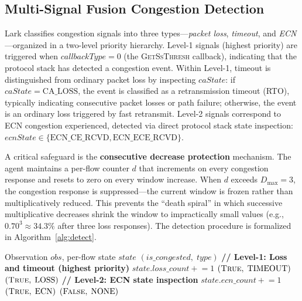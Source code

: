 \documentclass[10pt,twocolumn]{article}
\begin{document}
\subsection{Multi-Signal Fusion Congestion Detection}

Lark classifies congestion signals into three types---\textit{packet loss}, \textit{timeout}, and \textit{ECN}---organized in a two-level priority hierarchy. Level-1 signals (highest priority) are triggered when $callbackType = 0$ (the \textsc{GetSsThresh} callback), indicating that the protocol stack has detected a congestion event. Within Level-1, timeout is distinguished from ordinary packet loss by inspecting $caState$: if $caState = \text{CA\_LOSS}$, the event is classified as a retransmission timeout (RTO), typically indicating consecutive packet losses or path failure; otherwise, the event is an ordinary loss triggered by fast retransmit. Level-2 signals correspond to ECN congestion experienced, detected via direct protocol stack state inspection: $ecnState \in \{\text{ECN\_CE\_RCVD}, \text{ECN\_ECE\_RCVD}\}$.

A critical safeguard is the \textbf{consecutive decrease protection} mechanism. The agent maintains a per-flow counter $d$ that increments on every congestion response and resets to zero on every window increase. When $d$ exceeds $D_{\max} = 3$, the congestion response is suppressed---the current window is frozen rather than multiplicatively reduced. This prevents the ``death spiral'' in which successive multiplicative decreases shrink the window to impractically small values (e.g., $0.70^3 \approx 34.3\%$ after three loss responses). The detection procedure is formalized in Algorithm~\ref{alg:detect}.

\begin{algorithm}[htbp]
\caption{Multi-Signal Fusion Congestion Detection}
\label{alg:detect}
\small
\begin{algorithmic}[1]
\REQUIRE Observation $obs$, per-flow state $state$
\ENSURE $(is\_congested, \; type)$
\STATE \textbf{// Level-1: Loss and timeout (highest priority)}
    \STATE $state.loss\_count \mathrel{+}= 1$
        \RETURN $(\textsc{True}, \; \text{TIMEOUT})$
    \ELSE
        \RETURN $(\textsc{True}, \; \text{LOSS})$
    \ENDIF
\ENDIF
\STATE \textbf{// Level-2: ECN state inspection}
    \STATE $state.ecn\_count \mathrel{+}= 1$
    \RETURN $(\textsc{True}, \; \text{ECN})$
\ENDIF
\RETURN $(\textsc{False}, \; \text{NONE})$
\end{algorithmic}
\end{algorithm}
\end{document}
